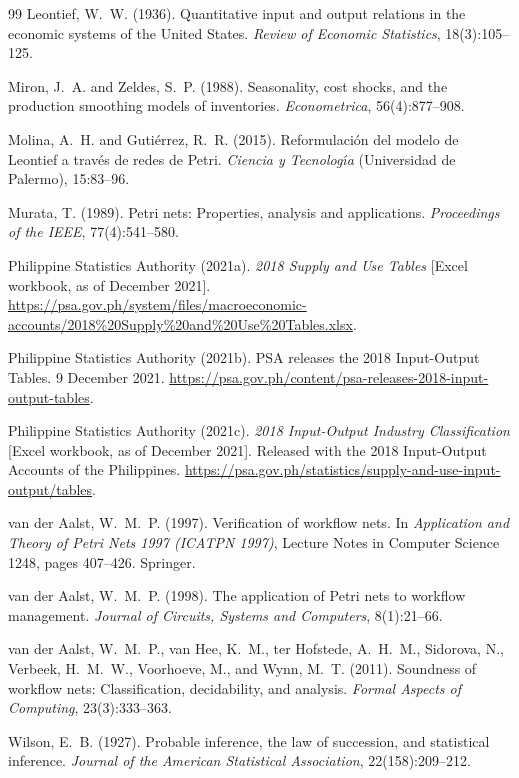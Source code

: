 \documentclass[11pt]{article}
\begin{document}
\begin{thebibliography}{99}
Leontief, W.~W. (1936). Quantitative input and output relations in the economic systems of the United States. \emph{Review of Economic Statistics}, 18(3):105--125.

Miron, J.~A. and Zeldes, S.~P. (1988). Seasonality, cost shocks, and the production smoothing models of inventories. \emph{Econometrica}, 56(4):877--908.

Molina, A.~H. and Guti{\'e}rrez, R.~R. (2015). Reformulaci{\'o}n del modelo de Leontief a trav{\'e}s de redes de Petri. \emph{Ciencia y Tecnolog{\'\i}a} (Universidad de Palermo), 15:83--96.

Murata, T. (1989). Petri nets: Properties, analysis and applications. \emph{Proceedings of the IEEE}, 77(4):541--580.

Philippine Statistics Authority (2021a). \emph{2018 Supply and Use Tables} [Excel workbook, as of December 2021]. \url{https://psa.gov.ph/system/files/macroeconomic-accounts/2018\%20Supply\%20and\%20Use\%20Tables.xlsx}.

Philippine Statistics Authority (2021b). PSA releases the 2018 Input-Output Tables. 9 December 2021. \url{https://psa.gov.ph/content/psa-releases-2018-input-output-tables}.

Philippine Statistics Authority (2021c). \emph{2018 Input-Output Industry Classification} [Excel workbook, as of December 2021]. Released with the 2018 Input-Output Accounts of the Philippines. \url{https://psa.gov.ph/statistics/supply-and-use-input-output/tables}.

van der Aalst, W.~M.~P. (1997). Verification of workflow nets. In \emph{Application and Theory of Petri Nets 1997 (ICATPN 1997)}, Lecture Notes in Computer Science 1248, pages 407--426. Springer.

van der Aalst, W.~M.~P. (1998). The application of Petri nets to workflow management. \emph{Journal of Circuits, Systems and Computers}, 8(1):21--66.

van der Aalst, W.~M.~P., van Hee, K.~M., ter Hofstede, A.~H.~M., Sidorova, N., Verbeek, H.~M.~W., Voorhoeve, M., and Wynn, M.~T. (2011). Soundness of workflow nets: Classification, decidability, and analysis. \emph{Formal Aspects of Computing}, 23(3):333--363.

Wilson, E.~B. (1927). Probable inference, the law of succession, and statistical inference. \emph{Journal of the American Statistical Association}, 22(158):209--212.

\end{thebibliography}
\end{document}
